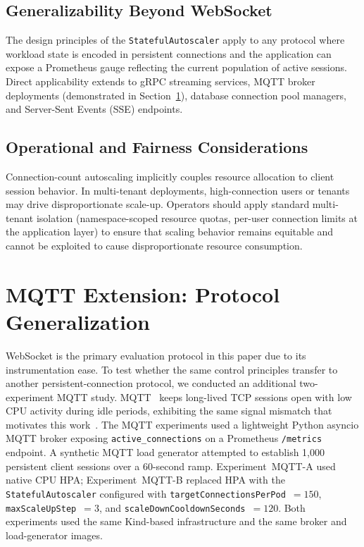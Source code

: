 \documentclass[twocolumn]{svjour3}
\begin{document}
\subsection{Generalizability Beyond WebSocket}

The design principles of the \texttt{StatefulAutoscaler} apply to any protocol where workload
state is encoded in persistent connections and the application can expose a Prometheus gauge
reflecting the current population of active sessions. Direct applicability extends to gRPC
streaming services, MQTT broker deployments (demonstrated in Section~\ref{sec:mqtt_extension}),
database connection pool managers, and Server-Sent Events (SSE) endpoints.

\subsection{Operational and Fairness Considerations}

Connection-count autoscaling implicitly couples resource allocation to client session behavior.
In multi-tenant deployments, high-connection users or tenants may drive disproportionate
scale-up. Operators should apply standard multi-tenant isolation (namespace-scoped resource
quotas, per-user connection limits at the application layer) to ensure that scaling behavior
remains equitable and cannot be exploited to cause disproportionate resource consumption.



\section{MQTT Extension: Protocol Generalization}
\label{sec:mqtt_extension}

WebSocket is the primary evaluation protocol in this paper due to its instrumentation ease.
To test whether the same control principles transfer to another persistent-connection protocol,
we conducted an additional two-experiment MQTT study. MQTT~\cite{mqtt_v31} keeps long-lived
TCP sessions open with low CPU activity during idle periods, exhibiting the same signal
mismatch that motivates this work~\cite{soni2017mqtt}. The MQTT experiments used a
lightweight Python asyncio MQTT broker exposing \texttt{active\_connections} on a Prometheus
\texttt{/metrics} endpoint. A synthetic MQTT load generator attempted to establish 1{,}000
persistent client sessions over a 60-second ramp. Experiment~MQTT-A used native CPU HPA;
Experiment~MQTT-B replaced HPA with the \texttt{StatefulAutoscaler} configured with
\texttt{targetConnectionsPerPod}~$= 150$, \texttt{maxScaleUpStep}~$= 3$, and
\texttt{scaleDownCooldownSeconds}~$= 120$. Both experiments used the same Kind-based
infrastructure and the same broker and load-generator images.
\end{document}
